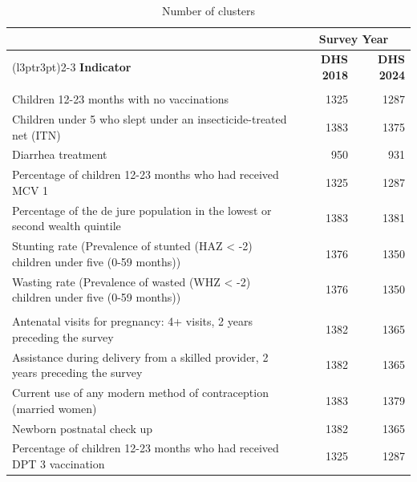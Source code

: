 \documentclass[
]{article}
\begin{document}
\begin{table}[!h]
\centering
\caption{\label{tab:unnamed-chunk-7}Number of clusters}
\centering
\begin{tabular}[t]{lrr}
\toprule
\multicolumn{1}{c}{ } & \multicolumn{2}{c}{Survey Year} \\
\cmidrule(l{3pt}r{3pt}){2-3}
\textbf{Indicator} & \textbf{DHS 2018} & \textbf{DHS 2024}\\
\midrule
\addlinespace[0.3em]
\multicolumn{3}{l}{\textbf{Child Health}}\\
\hspace{1em}Children 12-23 months with no vaccinations & 1325 & 1287\\
\hspace{1em}Children under 5 who slept under an insecticide-treated net (ITN) & 1383 & 1375\\
\hspace{1em}Diarrhea treatment & 950 & 931\\
\hspace{1em}Percentage of children 12-23 months who had received MCV 1 & 1325 & 1287\\
\hspace{1em}Percentage of the de jure population in the lowest or second wealth quintile & 1383 & 1381\\
\hspace{1em}Stunting rate (Prevalence of stunted (HAZ < -2) children under five (0-59 months)) & 1376 & 1350\\
\hspace{1em}Wasting rate (Prevalence of wasted (WHZ < -2) children under five (0-59 months)) & 1376 & 1350\\
\addlinespace[0.3em]
\multicolumn{3}{l}{\textbf{Maternal Health}}\\
\hspace{1em}Antenatal visits for pregnancy: 4+ visits, 2 years preceding the survey & 1382 & 1365\\
\hspace{1em}Assistance during delivery from a skilled provider, 2 years preceding the survey & 1382 & 1365\\
\hspace{1em}Current use of any modern method of contraception (married women) & 1383 & 1379\\
\hspace{1em}Newborn postnatal check up & 1382 & 1365\\
\hspace{1em}Percentage of children 12-23 months who had received DPT 3 vaccination & 1325 & 1287\\

\end{tabular}
\end{table}
\end{document}
